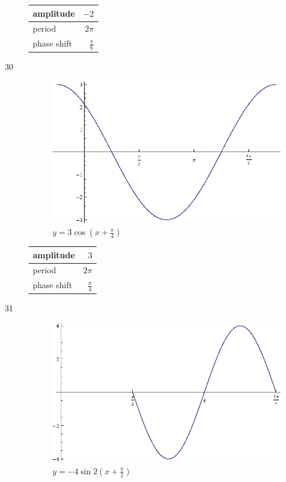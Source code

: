 \documentclass{exam}
\begin{document}
\begin{description}
        \begin{tabular}[H]{lr}
          \toprule
          amplitude & $-2$ \\
          \midrule
          period & $2 \pi$ \\
          \midrule
          phase shift & $\frac{\pi}{6}$ \\
          \bottomrule
        \end{tabular}

      \item[30]
        \begin{figure}[H]
          \centering
          \includegraphics[scale=0.8]{exercise30.eps}
          \caption{$y = 3 \cos \left( x + \frac{\pi}{4} \right)$}
        \end{figure}

        \begin{tabular}[H]{lr}
          \toprule
          amplitude & $3$ \\
          \midrule
          period & $2 \pi$ \\
          \midrule
          phase shift & $\frac{\pi}{4}$ \\
          \bottomrule
        \end{tabular}

      \item[31]
        \begin{figure}[H]
          \centering
          \includegraphics[scale=0.8]{exercise31.eps}
          \caption{$y = -4 \sin 2 \left( x + \frac{\pi}{2} \right)$}
        \end{figure}


\end{description}
\end{document}
